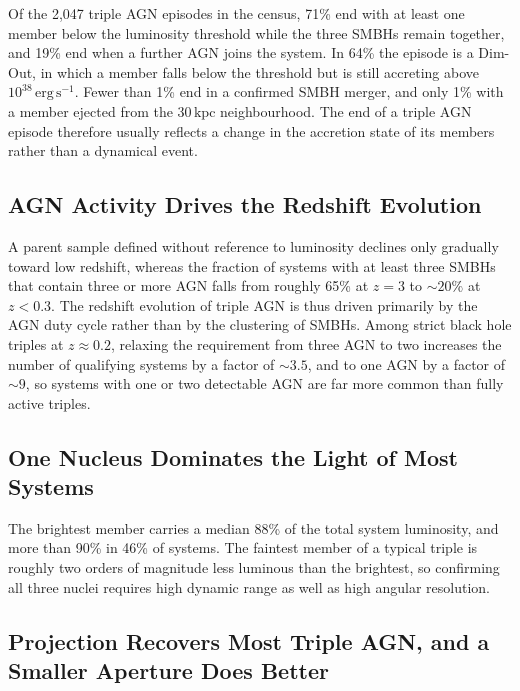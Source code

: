 \documentclass[twocolumn, 10pt]{article}
\begin{document}
Of the 2,047 triple AGN episodes in the census, 71\% end with at least
one member below the luminosity threshold while the three SMBHs remain
together, and 19\% end when a further AGN joins the system. In 64\%
the episode is a Dim-Out, in which a member falls below the threshold
but is still accreting above $10^{38}\,\mathrm{erg\,s^{-1}}$. Fewer than
1\% end in a confirmed SMBH merger, and only 1\% with a member ejected
from the $30\,\mathrm{kpc}$ neighbourhood. The end of a triple AGN episode
therefore usually reflects a change in the accretion state of its
members rather than a dynamical event.

\subsection*{AGN Activity Drives the Redshift Evolution}

A parent sample defined without reference to luminosity declines only
gradually toward low redshift, whereas the fraction of systems with at
least three SMBHs that contain three or more AGN falls from roughly
65\% at $z = 3$ to $\sim 20\%$ at $z < 0.3$. The redshift evolution of
triple AGN is thus driven primarily by the AGN duty cycle rather than
by the clustering of SMBHs. Among strict black hole triples at
$z \approx 0.2$, relaxing the requirement from three AGN to two
increases the number of qualifying systems by a factor of $\sim 3.5$,
and to one AGN by a factor of $\sim 9$, so systems with one or two
detectable AGN are far more common than fully active triples.

\subsection*{One Nucleus Dominates the Light of Most Systems}

The brightest member carries a median 88\% of the total system
luminosity, and more than 90\% in 46\% of systems. The faintest member
of a typical triple is roughly two orders of magnitude less luminous
than the brightest, so confirming all three nuclei requires high
dynamic range as well as high angular resolution.

\subsection*{Projection Recovers Most Triple AGN, and a Smaller
Aperture Does Better}
\end{document}
